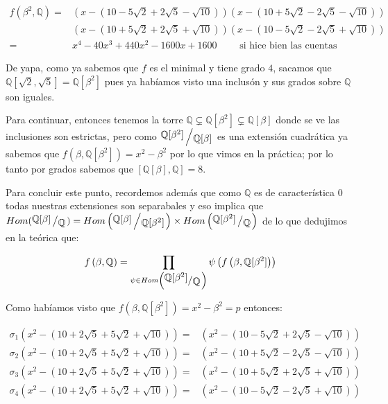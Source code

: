 \documentclass[11pt]{article}
\newcommand{\Q}{\mathbb{Q}}
\newcommand{\quotient}[2]{{\raisebox{.2em}{$#1$}\left/\raisebox{-.2em}{$#2$}\right.}}
\numberwithin{theorem}{subsection}
\begin{document}
\begin{enumerate}
\begin{itemize}
		\begin{equation*}
			\begin{aligned}
				f \left(\beta^2, \Q\right) = & \left(x - \left(10 -5\sqrt{2} + 2\sqrt{5} - \sqrt{10}\right)\right)\left(x - \left(10 +5\sqrt{2} - 2\sqrt{5} - \sqrt{10}\right)\right) \\
				& \left(x - \left(10 +5\sqrt{2} + 2\sqrt{5} + \sqrt{10}\right)\right)\left(x - \left(10 -5\sqrt{2} - 2\sqrt{5} + \sqrt{10}\right)\right) \\
				= & x^4 - 40x^3 + 440x^2 - 1600 x +1600 \qquad \text{ si hice bien las cuentas}
			\end{aligned}
		\end{equation*}
		
		De yapa, como ya sabemos que $f$ es el minimal y tiene grado $4$, sacamos que $\Q[\sqrt{2}, \sqrt{5}] = \Q[\beta^2]$ pues  ya hab\'iamos visto una inclus\'on y sus grados sobre $\Q$ son iguales.
		
		Para continuar, entonces tenemos la torre $\Q \subsetneq \Q[\beta^2] \subsetneq \Q[\beta]$ donde se ve las inclusiones son estrictas, pero como $\quotient{\Q[\beta^2]}{\Q[\beta]}$ es una extensi\'on cuadr\'atica ya sabemos que $f(\beta, \Q[\beta^2]) = x^2 - \beta^2$ por lo que vimos en la pr\'actica; por lo tanto por grados sabemos que $[\Q[\beta], \Q] = 8$.
		
		Para concluir este punto, recordemos adem\'as que como $\Q$ es de caracter\'istica 0 todas nuestras extensiones son separabales y eso implica que $Hom(\quotient{\Q[\beta]}{\Q}) = Hom\left(\quotient{\Q[\beta]}{\Q[\beta^2]}\right) \times Hom\left(\quotient{\Q[\beta^2]}{\Q}\right)$ de lo que dedujimos en la te\'orica que:
		
		\begin{equation*}
			f\left(\beta, \Q\right) = \prod\limits_{\psi \in Hom\left(\quotient{\Q[\beta^2]}{\Q}\right)}{\psi \left(f\left(\beta, \Q[\beta^2]\right)\right)}
		\end{equation*}
		
		Como hab\'iamos visto que $f\left(\beta, \Q[\beta^2]\right) = x^2 - \beta^2 = p$ entonces:
		
		\begin{equation*}
			\begin{aligned}
				\sigma_1\left(x^2 - \left(10 + 2\sqrt{5} + 5\sqrt{2} + \sqrt{10}\right)\right) = & \left(x^2 - \left(10 -5\sqrt{2} + 2\sqrt{5} - \sqrt{10}\right)\right) \\
				\sigma_2\left(x^2 - \left(10 + 2\sqrt{5} + 5\sqrt{2} + \sqrt{10}\right)\right) = & \left(x^2 - \left(10 +5\sqrt{2} - 2\sqrt{5} - \sqrt{10}\right)\right) \\
				\sigma_3\left(x^2 - \left(10 + 2\sqrt{5} + 5\sqrt{2} + \sqrt{10}\right)\right) = & \left(x^2 - \left(10 +5\sqrt{2} + 2\sqrt{5} + \sqrt{10}\right)\right)\\
				\sigma_4\left(x^2 - \left(10 + 2\sqrt{5} + 5\sqrt{2} + \sqrt{10}\right)\right) = & \left(x^2 - \left(10 -5\sqrt{2} - 2\sqrt{5} + \sqrt{10}\right)\right)
			\end{aligned}
		\end{equation*}
		

\end{itemize}
\end{enumerate}
\end{document}
